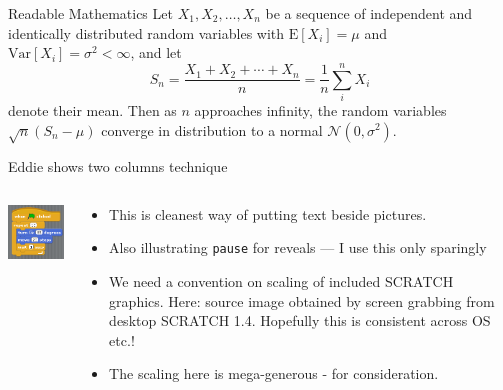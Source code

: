 \documentclass{beamer}
\begin{document}
\begin{frame}{Readable Mathematics}
Let $X_1, X_2, \ldots, X_n$ be a sequence of independent and identically distributed random variables with $\text{E}[X_i] = \mu$ and $\text{Var}[X_i] = \sigma^2 < \infty$, and let
$$S_n = \frac{X_1 + X_2 + \cdots + X_n}{n}
      = \frac{1}{n}\sum_{i}^{n} X_i$$
denote their mean. Then as $n$ approaches infinity, the random variables $\sqrt{n}(S_n - \mu)$ converge in distribution to a normal $\mathcal{N}(0, \sigma^2)$.
\end{frame}

\begin{frame}{Eddie shows two columns technique}
\begin{columns}
\begin{column}{0.4\textwidth}
\begin{center}
\includegraphics[scale=0.75]{SCRATCHgrab.png}
\end{center}
\end{column}
\begin{column}{0.6\textwidth}
\begin{itemize}
\item This is cleanest way of putting text beside
pictures. 
\pause\medskip
\item Also illustrating {\tt pause} for reveals --- I 
use this only sparingly
\pause\medskip
\item We need a convention on scaling of included SCRATCH graphics. Here: source image obtained by screen grabbing from desktop SCRATCH 1.4. Hopefully this is consistent across OS etc.! 
\medskip
\item The scaling here is mega-generous - for consideration.
\end{itemize}
\end{column}
\end{columns}
\end{frame}
\end{document}
